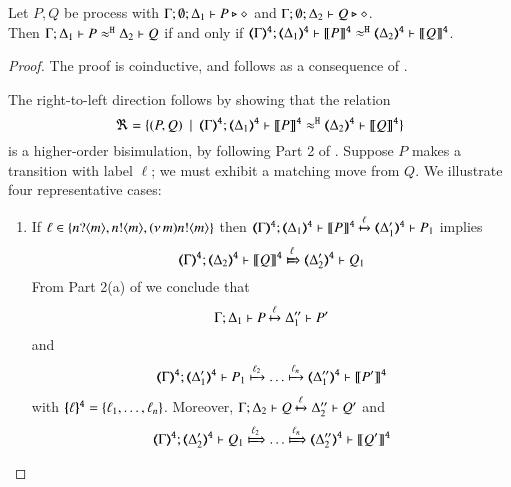 \begin{proposition}\myrm
	\label{app:prop:fulla_pHOp_to_HOp}
	Let $P, Q$ be \HOpp process with $\Gamma; \emptyset; \Delta_1 \vdash P \triangleright \diamond$ and 
	$\Gamma; \emptyset; \Delta_2 \vdash Q \triangleright \diamond$. \\
	Then
	$\Gamma; \Delta_1 \vdash P \approx^\mathtt{H} \Delta_2 \vdash Q$ if and only if $\horel{\tmap{\Gamma}{4}}{\tmap{\Delta_1}{4}}{\pmap{P}{4}}{\hwb}{\tmap{\Delta_2}{4}}{\pmap{Q}{4}}$.
\end{proposition}

\begin{proof}
	The proof is coinductive, and follows as a consequence of .

\bigskip
\noi The right-to-left direction follows by showing that the relation
%
	\[
		\Re = \set{
		(P, Q) 
		\setbar \horel{\tmap{\Gamma}{4}}{\tmap{\Delta_1}{4}}{\pmap{P}{4}}{\hwb}{\tmap{\Delta_2}{4}}{\pmap{Q}{4}}}
	\]
is a higher-order bisimulation, by following Part 2 of . 
	Suppose $P$ makes a transition with label $\ell$; we must exhibit a matching move from $Q$.
	We illustrate four representative cases:
	\begin{enumerate}
		\item	If $\ell \in \{n ? \langle m \rangle, n ! \langle m \rangle, (\nu\, m) n ! \langle m \rangle\}$ then
		$
		\horel{\tmap{\Gamma}{4}}{\tmap{\Delta_1}{4}}{\pmap{P}{4}}{\hby{\ell}}{\tmap{\Delta_1'}{4}}{P_1}
		$
		implies
		\[
		\horel{\tmap{\Gamma}{4}}{\tmap{\Delta_2}{4}}{\pmap{Q}{4}}{\Hby{\ell}}{\tmap{\Delta_2'}{4}}{Q_1}
		\]
		From Part 2(a) of  we conclude that
		\[
		\Gamma; \Delta_1 \vdash P \xmapsto{\ell} \Delta_1'' \vdash P'
		\]
		and
		\[
		\horel{\tmap{\Gamma}{4}}{\tmap{\Delta_1'}{4}}{P_1}{\hby{\ell_2} \dots \hby{\ell_n}}
		{\tmap{\Delta_1''}{4}}{\pmap{P'}{4}}
		\]
		with $\{\!\!\{\ell\}\!\!\}^{\mathtt{4}} = \{\ell_1, \dots, \ell_n\}$.
				Moreover,
		$
			\Gamma; \Delta_2 \vdash Q \xmapsto{\ell} \Delta_2'' \vdash Q'
		$
		and
		\[
		\horel{\tmap{\Gamma}{4}}{\tmap{\Delta_2'}{4}}{Q_1}{\Hby{\ell_2} \dots \Hby{\ell_n}}
		{\tmap{\Delta_2''}{4}}{\pmap{Q'}{4}}
		\]
		

\end{enumerate}
\end{proof}
